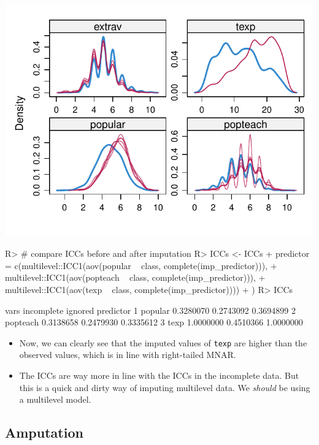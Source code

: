 \documentclass[
]{jss}
\begin{document}
\begin{CodeChunk}
\begin{center}\includegraphics{Manuscript_files/figure-latex/pop-predictor-3} \end{center}

\begin{CodeInput}
R> # compare ICCs before and after imputation
R> ICCs <- ICCs %
+            predictor = c(multilevel::ICC1(aov(popular ~ class, complete(imp_predictor))), 
+                         multilevel::ICC1(aov(popteach ~ class, complete(imp_predictor))), 
+                         multilevel::ICC1(aov(texp ~ class, complete(imp_predictor))))
+            )
R> ICCs
\end{CodeInput}
\begin{CodeOutput}
      vars incomplete   ignored predictor
1  popular  0.3280070 0.2743092 0.3694899
2 popteach  0.3138658 0.2479930 0.3335612
3     texp  1.0000000 0.4510366 1.0000000
\end{CodeOutput}
\end{CodeChunk}

\begin{itemize}
\item
  Now, we can clearly see that the imputed values of \texttt{texp} are
  higher than the observed values, which is in line with right-tailed
  MNAR.
\item
  The ICCs are way more in line with the ICCs in the incomplete data.
  But this is a quick and dirty way of imputing multilevel data. We
  \emph{should} be using a multilevel model.
\end{itemize}

\hypertarget{amputation}{%
\subsection{Amputation}\label{amputation}}
\end{document}
